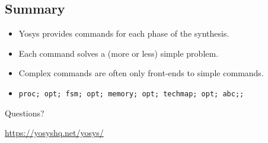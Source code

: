 
\subsection{Summary}

\begin{frame}{\subsecname}
\begin{itemize}
\item Yosys provides commands for each phase of the synthesis.
\item Each command solves a (more or less) simple problem.
\item Complex commands are often only front-ends to simple commands.
\item {\tt proc; opt; fsm; opt; memory; opt; techmap; opt; abc;;}
\end{itemize}

\bigskip
\bigskip
\begin{center}
Questions?
\end{center}

\bigskip
\bigskip
\begin{center}
\url{https://yosyshq.net/yosys/}
\end{center}
\end{frame}

